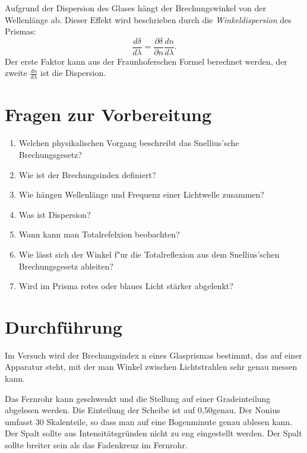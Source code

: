 \noindent
Aufgrund der Dispersion des Glases hängt der Brechungswinkel von der Wellenlänge ab. Dieser Effekt wird beschrieben durch die \textit{Winkeldispersion} des Prismas:
\begin{equation}
	\frac{d\delta}{d\lambda} = \frac{\partial\delta}{\partial n} \frac{dn}{d\lambda}.
\end{equation}
Der erste Faktor kann aus der Fraunhoferschen Formel berechnet werden, der zweite $\frac{dn}{d\lambda}$ ist die Dispersion.
\section{Fragen zur Vorbereitung}

\begin{enumerate}
 \item Welchen physikalischen Vorgang beschreibt das Snellius'sche Brechungsgesetz?
 \item Wie ist der Brechungsindex definiert?
 \item Wie hängen Wellenlänge und Frequenz einer Lichtwelle zusammen?
 \item Was ist Dispersion?
 \item Wann kann man Totalrefelxion beobachten?
 \item Wie lässt sich der Winkel f"ur die Totalreflexion aus dem Snellius'schen Brechungsgesetz ableiten?
 \item Wird im Prisma rotes oder blaues Licht stärker abgelenkt?
\end{enumerate}

\section{Durchführung} 

Im Versuch wird der Brechungsindex n eines Glasprismas bestimmt, das auf einer Apparatur steht, mit der man Winkel zwischen Lichtstrahlen sehr genau messen kann.

\noindent
Das Fernrohr kann geschwenkt und die Stellung auf einer Gradeinteilung abgelesen werden. Die Einteilung der Scheibe ist auf 0,50\degree genau. Der Nonius umfasst 30 Skalenteile, so dass man auf eine Bogenminute genau ablesen kann.\\
Der Spalt sollte aus Intensitätsgründen nicht zu eng eingestellt werden. Der Spalt sollte breiter sein als das Fadenkreuz im Fernrohr.


